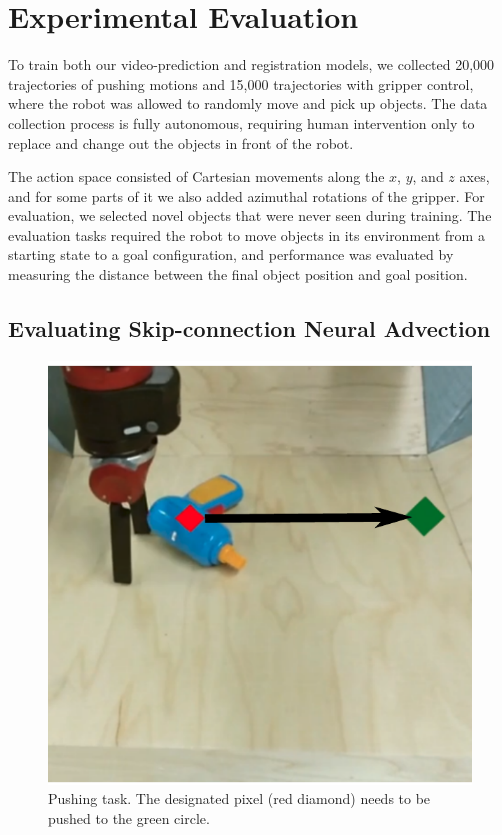 \section{Experimental Evaluation}


To train both our video-prediction and registration models, we collected 20,000 trajectories of pushing motions and 15,000 trajectories with gripper control, where the robot was allowed to randomly move and pick up objects. The data collection process is fully autonomous, requiring human intervention only to replace and change out the objects in front of the robot.

The action space consisted of Cartesian movements along the $x$, $y$, and $z$ axes, and for some parts of it we also added azimuthal rotations of the gripper. For evaluation, we selected novel objects that were never seen during training. The evaluation tasks required the robot to move objects in its environment from a starting state to a goal configuration, and performance was evaluated by measuring the distance between the final object position and goal position. 

\subsection{Evaluating Skip-connection Neural Advection}
\label{subsec:sna_experiments}
\begin{figure}
	\centering
	\includegraphics[width=0.30\columnwidth]{images_sna/longdistance_pushing/pushing.pdf}
	\caption{
		Pushing task. The designated pixel (red diamond) needs to be pushed to the green circle.
		\label{fig:long_distance_task}
	}
\end{figure}

